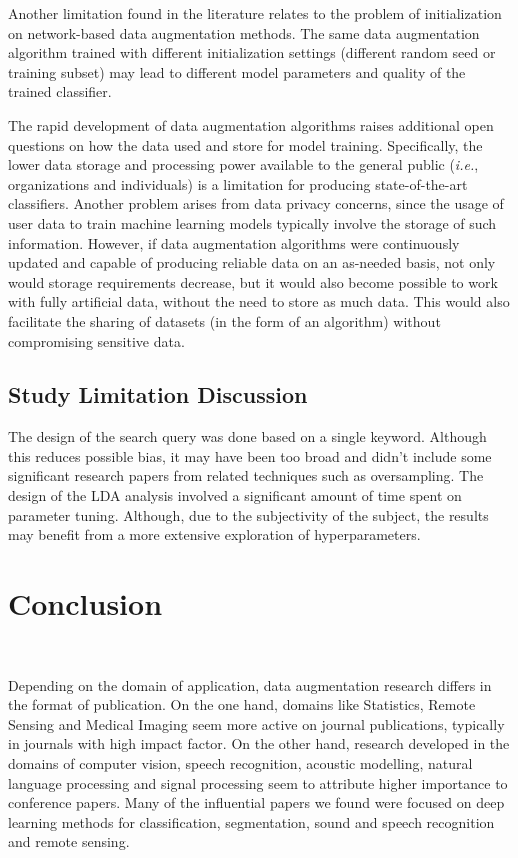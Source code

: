\documentclass[parskip=full]{scrartcl}
\begin{document}
Another limitation found in the literature relates to the problem of
initialization on network-based data augmentation methods. The same data
augmentation algorithm trained with different initialization settings
(different random seed or training subset) may lead to different model
parameters and quality of the trained classifier.

The rapid development of data augmentation algorithms raises additional open
questions on how the data used and store for model training. Specifically, the
lower data storage and processing power available to the general public
(\textit{i.e.}, organizations and individuals) is a limitation for producing
state-of-the-art classifiers. Another problem arises from data privacy
concerns, since the usage of user data to train machine learning models
typically involve the storage of such information. However, if data
augmentation algorithms were continuously updated and capable of producing
reliable data on an as-needed basis, not only would storage requirements
decrease, but it would also become possible to work with fully artificial
data, without the need to store as much data. This would also facilitate the
sharing of datasets (in the form of an algorithm) without compromising
sensitive data.

\subsection{Study Limitation Discussion}

The design of the search query was done based on a single keyword. Although
this reduces possible bias, it may have been too broad and didn't include some
significant research papers from related techniques such as oversampling. The
design of the LDA analysis involved a significant amount of time spent on
parameter tuning.  Although, due to the subjectivity of the subject, the
results may benefit from a more extensive exploration of hyperparameters. 

\section{Conclusion}~\label{sec:conclusion}

Depending on the domain of application, data augmentation research differs in
the format of publication. On the one hand, domains like Statistics, Remote
Sensing and Medical Imaging seem more active on journal publications,
typically in journals with high impact factor. On the other hand, research
developed in the domains of computer vision, speech recognition, acoustic
modelling, natural language processing and signal processing seem to attribute
higher importance to conference papers. Many of the influential papers we found
were focused on deep learning methods for classification, segmentation, sound
and speech recognition and remote sensing.
\end{document}
